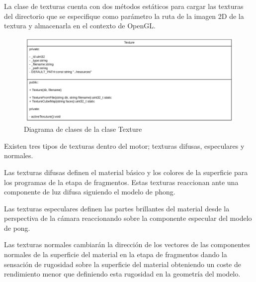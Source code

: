 \documentclass[a4paper, 17pt]{book}
\begin{document}
\vspace{1mm} %

La clase de texturas cuenta con dos métodos estáticos para cargar las texturas del directorio que se especifique como parámetro la ruta
de la imagen 2D de la textura y almacenarla en el contexto de OpenGL. 

\begin{figure}[H]
    \centering
    \includegraphics[scale=0.25, keepaspectratio]{img/Texture.png}
    \caption{Diagrama de clases de la clase Texture}
    \label{figura:Texture}
\end{figure}

Existen tres tipos de texturas dentro del motor; texturas difusas, especulares y normales.

\vspace{1mm} %

Las texturas difusas definen el material básico y los colores de la superficie para los programas de la etapa de fragmentos. Estas
texturas reaccionan ante una componente de luz difusa siguiendo el modelo de phong.

\vspace{1mm} %

Las texturas especulares definen las partes brillantes del material desde la perspectiva de la cámara reaccionando sobre la componente
especular del modelo de pong.

\vspace{1mm} %

Las texturas normales cambiarán la dirección de los vectores de las componentes normales de la superficie del material en la etapa de
fragmentos dando la sensación de rugosidad sobre la superficie del material obteniendo un coste de rendimiento menor que definiendo
esta rugosidad en la geometría del modelo.
\end{document}
